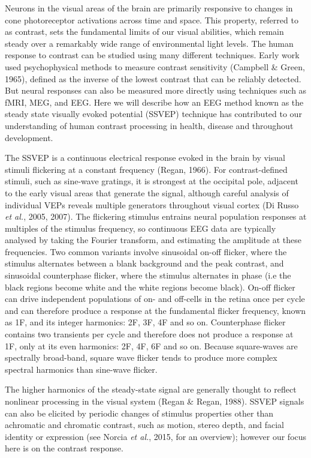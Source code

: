 \documentclass[
  letterpaper,
  DIV=11,
  numbers=noendperiod]{scrartcl}
\begin{document}
Neurons in the visual areas of the brain are primarily responsive to
changes in cone photoreceptor activations across time and space. This
property, referred to as contrast, sets the fundamental limits of our
visual abilities, which remain steady over a remarkably wide range of
environmental light levels. The human response to contrast can be
studied using many different techniques. Early work used psychophysical
methods to measure contrast sensitivity (Campbell \& Green, 1965),
defined as the inverse of the lowest contrast that can be reliably
detected. But neural responses can also be measured more directly using
techniques such as fMRI, MEG, and EEG. Here we will describe how an EEG
method known as the steady state visually evoked potential (SSVEP)
technique has contributed to our understanding of human contrast
processing in health, disease and throughout development.

The SSVEP is a continuous electrical response evoked in the brain by
visual stimuli flickering at a constant frequency (Regan, 1966). For
contrast-defined stimuli, such as sine-wave gratings, it is strongest at
the occipital pole, adjacent to the early visual areas that generate the
signal, although careful analysis of individual VEPs reveals multiple
generators throughout visual cortex (Di Russo \emph{et al.}, 2005,
2007). The flickering stimulus entrains neural population responses at
multiples of the stimulus frequency, so continuous EEG data are
typically analysed by taking the Fourier transform, and estimating the
amplitude at these frequencies. Two common variants involve sinusoidal
on-off flicker, where the stimulus alternates between a blank background
and the peak contrast, and sinusoidal counterphase flicker, where the
stimulus alternates in phase (i.e the black regions become white and the
white regions become black). On-off flicker can drive independent
populations of on- and off-cells in the retina once per cycle and can
therefore produce a response at the fundamental flicker frequency, known
as 1F, and its integer harmonics: 2F, 3F, 4F and so on. Counterphase
flicker contains two transients per cycle and therefore does not produce
a response at 1F, only at its even harmonics: 2F, 4F, 6F and so on.
Because square-waves are spectrally broad-band, square wave flicker
tends to produce more complex spectral harmonics than sine-wave flicker.

The higher harmonics of the steady-state signal are generally thought to
reflect nonlinear processing in the visual system (Regan \& Regan,
1988). SSVEP signals can also be elicited by periodic changes of
stimulus properties other than achromatic and chromatic contrast, such
as motion, stereo depth, and facial identity or expression (see Norcia
\emph{et al.}, 2015, for an overview); however our focus here is on the
contrast response.
\end{document}
